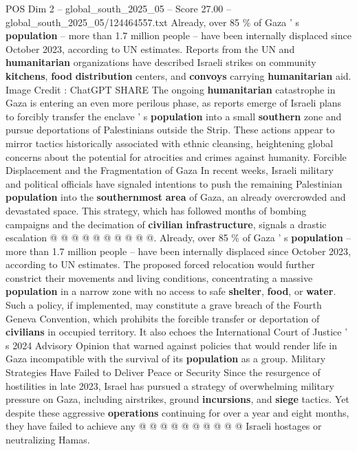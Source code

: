 \begin{textsample}{POS Dim 2 – global\_south\_2025\_05 – Score 27.00 – global\_south\_2025\_05/124464557.txt}  \label{ex:f2_pos_047}
Already, over 85 \% of Gaza ' s \textbf{population} -- more than 1.7 million people -- have been internally displaced since October 2023, according to UN estimates.
Reports from the UN and \textbf{humanitarian} organizations have described Israeli strikes on community \textbf{kitchens}, \textbf{food} \textbf{distribution} centers, and \textbf{convoys} carrying \textbf{humanitarian} aid.
Image Credit : ChatGPT SHARE The ongoing \textbf{humanitarian} catastrophe in Gaza is entering an even more perilous phase, as reports emerge of Israeli plans to forcibly transfer the enclave ' s \textbf{population} into a small \textbf{southern} zone and pursue deportations of Palestinians outside the Strip.
These actions appear to mirror tactics historically associated with ethnic cleansing, heightening global concerns about the potential for atrocities and crimes against humanity.
Forcible Displacement and the Fragmentation of Gaza In recent weeks, Israeli military and political officials have signaled intentions to push the remaining Palestinian \textbf{population} into the \textbf{southernmost} \textbf{area} of Gaza, an already overcrowded and devastated space.
This strategy, which has followed months of bombing campaigns and the decimation of \textbf{civilian} \textbf{infrastructure}, signals a drastic escalation @ @ @ @ @ @ @ @ @ @.
Already, over 85 \% of Gaza ' s \textbf{population} -- more than 1.7 million people -- have been internally displaced since October 2023, according to UN estimates.
The proposed forced relocation would further constrict their movements and living conditions, concentrating a massive \textbf{population} in a narrow zone with no access to safe \textbf{shelter}, \textbf{food}, or \textbf{water}.
Such a policy, if implemented, may constitute a grave breach of the Fourth Geneva Convention, which prohibits the forcible transfer or deportation of \textbf{civilians} in occupied territory.
It also echoes the International Court of Justice ' s 2024 Advisory Opinion that warned against policies that would render life in Gaza incompatible with the survival of its \textbf{population} as a group.
Military Strategies Have Failed to Deliver Peace or Security Since the resurgence of hostilities in late 2023, Israel has pursued a strategy of overwhelming military pressure on Gaza, including airstrikes, ground \textbf{incursions}, and \textbf{siege} tactics.
Yet despite these aggressive \textbf{operations} continuing for over a year and eight months, they have failed to achieve any @ @ @ @ @ @ @ @ @ @ Israeli hostages or neutralizing Hamas.

\end{textsample}
